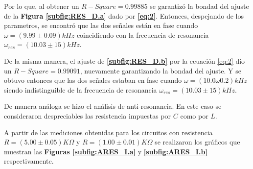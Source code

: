 \documentclass[11pt,a4paper]{article}
\begin{document}
Por lo que, al obtener un $R-Square = 0.99885$ se garantizó la bondad del ajuste de la \textbf{Figura \ref{subfig:RES_D.a}} dado por \textbf{\eqref{eq:2}}. Entonces, despejando de los parametros, se encontró que las dos señales están en fase cuando $\omega = ( 9.99 \pm 0.09) kHz$ coincidiendo con la frecuencia de resonancia $\omega_{res} = (10.03 \pm 15) kHz$.

De la misma manera, el ajuste de \textbf{\ref{subfig:RES_D.b}} por la ecuación \eqref{eq:2} dio un $R-Square = 0.99091$, nuevamente garantizando la bondad del ajuste. Y se obtuvo entonces que las dos señales estaban en fase cuando $\omega = (10.0 \omega 0.2) kHz$ siendo indistinguible de la frecuencia de resonancia $\omega_{res} = (10.03 \pm 15) kHz$.

\bigskip

De manera análoga se hizo el análisis de anti-resonancia. En este caso se consideraron despreciables las resistencia impuestas por $C$ como por $L$.

A partir de las mediciones obtenidas para los circuitos con resistencia $R=(5.00 \pm 0.05) K\Omega$ y $R=(1.00 \pm 0.01)K\Omega$ se realizaron los gráficos que muestran las \textbf{Figuras \ref{subfig:ARES_I.a}} y \textbf{\ref{subfig:ARES_I.b}} respectivamente.
\end{document}
